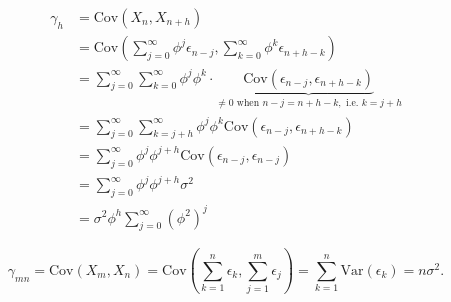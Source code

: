 \documentclass[12pt,letterpaper]{article}
\newcommand{\var}{\text{Var}}
\newcommand{\cov}{\text{Cov}}
\begin{document}
\begin{align*}
\gamma_h &= \cov\left(X_n,X_{n+h}\right)\\
	     &= \cov\left(\sum_{j=0}^\infty \phi^j \epsilon_{n-j},\sum_{k=0}^{\infty}\phi^k\epsilon_{n+h-k}\right)\\
	     &=\sum_{j=0}^\infty\sum_{k=0}^\infty\phi^j\phi^k\cdot\underbrace{\cov\left(\epsilon_{n-j},\epsilon_{n+h-k}\right)}_{\neq 0\text{ when }n-j=n+h-k,\text{ i.e. }k=j+h}\\
	     &=\sum_{j=0}^\infty\sum_{k=j+h}^\infty \phi^j\phi^k \cov(\epsilon_{n-j},\epsilon_{n+h-k})\\
	     &=\sum_{j=0}^\infty \phi^j\phi^{j+h}\cov(\epsilon_{n-j},\epsilon_{n-j})\\
	     &=\sum_{j=0}^\infty \phi^j\phi^{j+h}\sigma^2\\
	     &=\sigma^2\phi^h\sum_{j=0}^\infty (\phi^2)^j
\end{align*}

$$\gamma_{mn}=\cov\left(X_m,X_n\right)=\cov\left(\sum_{k=1}^n\epsilon_k,\sum_{j=1}^{m}\epsilon_j\right)=\sum_{k=1}^n\var(\epsilon_k)=n\sigma^2. $$
\end{document}

